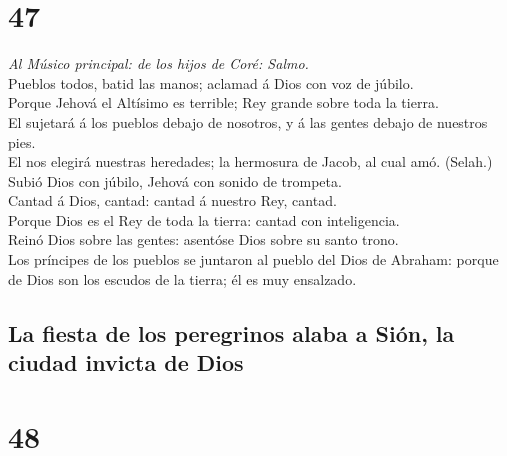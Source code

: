 \hypertarget{section-46}{%
\section{47}\label{section-46}}

 \emph{Al Músico principal: de los hijos de Coré: Salmo.}\\
Pueblos todos, batid las manos; aclamad á Dios con voz de júbilo.\\
 Porque Jehová el Altísimo es terrible; Rey grande sobre
toda la tierra.\\
 El sujetará á los pueblos debajo de nosotros, y á las
gentes debajo de nuestros pies.\\
 El nos elegirá nuestras heredades; la hermosura de Jacob,
al cual amó. (Selah.)\\
 Subió Dios con júbilo, Jehová con sonido de trompeta.\\
 Cantad á Dios, cantad: cantad á nuestro Rey, cantad.\\
 Porque Dios es el Rey de toda la tierra: cantad con
inteligencia.\\
 Reinó Dios sobre las gentes: asentóse Dios sobre su santo
trono.\\
 Los príncipes de los pueblos se juntaron al pueblo del Dios
de Abraham: porque de Dios son los escudos de la tierra; él es muy
ensalzado.

\hypertarget{la-fiesta-de-los-peregrinos-alaba-a-siuxf3n-la-ciudad-invicta-de-dios}{%
\subsection{La fiesta de los peregrinos alaba a Sión, la ciudad invicta
de
Dios}\label{la-fiesta-de-los-peregrinos-alaba-a-siuxf3n-la-ciudad-invicta-de-dios}}

\hypertarget{section-47}{%
\section{48}\label{section-47}}

